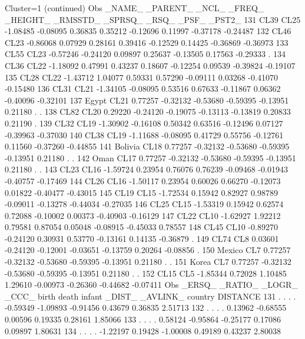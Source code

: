 \documentclass{article}
\begin{document}
\begin{Woutput}
Cluster=1
(continued)
Obs _NAME_   _PARENT_   _NCL_   _FREQ_  _HEIGHT_ _RMSSTD_  _SPRSQ_   _RSQ_    _PSF_   _PST2_
131 CL39       CL25   -1.08485 -0.08095  0.36835  0.35212 -0.12696  0.11997 -0.37178 -0.24487
132 CL46       CL23   -0.86068  0.07929  0.28161  0.39416 -0.12529  0.14425 -0.36869 -0.36973
133 CL55       CL23   -0.57246 -0.24120  0.09897  0.25637 -0.13505  0.17563 -0.29333   .
134 CL36       CL22   -1.18092  0.47991  0.43237  0.18607 -0.12254  0.09539 -0.39824 -0.19107
135 CL28       CL22   -1.43712  1.04077  0.59331  0.57290 -0.09111  0.03268 -0.41070 -0.15480
136 CL31       CL21   -1.34105 -0.08095  0.53516  0.67633 -0.11867  0.06362 -0.40096 -0.32101
137 Egypt      CL21    0.77257 -0.32132 -0.53680 -0.59395 -0.13951  0.21180   .        .
138 CL82       CL20    0.29220 -0.24120 -0.19075 -0.13113 -0.13819  0.20833  0.21190   .
139 CL32       CL19   -1.30902 -0.16108  0.50342  0.63516 -0.12496  0.07127 -0.39963 -0.37030
140 CL38       CL19   -1.11688 -0.08095  0.41729  0.55756 -0.12761  0.11560 -0.37260 -0.44855
141 Bolivia    CL18    0.77257 -0.32132 -0.53680 -0.59395 -0.13951  0.21180   .        .
142 Oman       CL17    0.77257 -0.32132 -0.53680 -0.59395 -0.13951  0.21180   .        .
143 CL23       CL16   -1.59724  0.23954  0.76076  0.76239 -0.09468 -0.01943 -0.40757 -0.17469
144 CL26       CL16   -1.50117  0.23954  0.60026  0.66270 -0.12073  0.01822 -0.40477 -0.43015
145 CL19       CL15   -1.72534  0.15942  0.82927  0.98789 -0.09011 -0.13278 -0.44034 -0.27035
146 CL25       CL15   -1.53319  0.15942  0.62574  0.72088 -0.10002  0.00373 -0.40903 -0.16129
147 CL22       CL10   -1.62927  1.92212  0.79581  0.87054  0.05048 -0.08915 -0.45033  0.78557
148 CL45       CL10   -0.89270 -0.24120  0.30931  0.53770 -0.13161  0.14135 -0.36879   .
149 CL74       CL8     0.03601 -0.24120 -0.12001 -0.03651 -0.13759  0.20264 -0.08856   .
150 Mexico     CL7     0.77257 -0.32132 -0.53680 -0.59395 -0.13951  0.21180   .        .
151 Korea      CL7     0.77257 -0.32132 -0.53680 -0.59395 -0.13951  0.21180   .        .
152 CL15       CL5    -1.85344  0.72028  1.10485  1.29610 -0.00973 -0.26360 -0.44682 -0.07411
Obs  _ERSQ_ _RATIO_  _LOGR_  _CCC_    birth    death   infant   _DIST_  _AVLINK_ country  DISTANCE
131  .       .       .       .      -0.59349 -1.09893 -0.91456  0.43679  0.36835           2.51713
132  .       .       .       .       0.13962 -0.68555  0.00596  0.19335  0.28161           1.85066
133  .       .       .       .       0.58124 -0.95864 -0.25177  0.17086  0.09897           1.80631
134  .       .       .       .      -1.22197  0.19428 -1.00008  0.49189  0.43237           2.80038

\end{Woutput}
\end{document}
